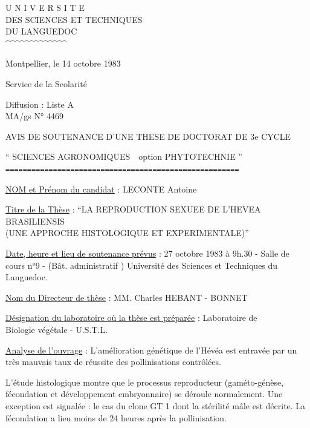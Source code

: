 
\begin{center}
U N I V E R S I T E\\
DES SCIENCES ET TECHNIQUES\\
DU LANGUEDOC\\
\textasciicircum\textasciicircum\textasciicircum\textasciicircum\textasciicircum\textasciicircum\textasciicircum\textasciicircum\textasciicircum\textasciicircum\textasciicircum\textasciicircum\textasciicircum
\end{center}

Montpellier, le 14 octobre 1983

Service de la Scolarité

Diffusion : Liste A\\
MA/gs \hfill N° 4469

\begin{center}
AVIS DE SOUTENANCE D'UNE THESE DE DOCTORAT DE 3e CYCLE

`` SCIENCES AGRONOMIQUES\ \ option PHYTOTECHNIE ''\\
\texttt{======================================================}
\end{center}

\uline{NOM et Prénom du candidat} : LECONTE Antoine

\uline{Titre de la Thèse} : ``LA REPRODUCTION SEXUEE DE L'HEVEA BRASILIENSIS\\
(UNE APPROCHE HISTOLOGIQUE ET EXPERIMENTALE)''

\uline{Date, heure et lieu de soutenance prévus} : 27 octobre 1983 à 9h.30 - Salle de cours n°9 - (Bât. administratif ) Université des Sciences et Techniques du Languedoc.

\uline{Nom du Directeur de thèse} : MM. Charles HEBANT - BONNET

\uline{Désignation du laboratoire où la thèse est préparée} : Laboratoire de\\
Biologie végétale - U.S.T.L.\hfill\handwritten{\unsure{\textbackslash}}

\uline{Analyse de l'ouvrage} : L'amélioration génétique de l'Hévéa est entravée par un très mauvais taux de réussite des pollinisations contrôlées.

L'étude histologique montre que le processus reproducteur (gaméto-génèse, fécondation et développement embryonnaire) se déroule normalement. Une exception est signalée : le cas du clone GT 1 dont la stérilité mâle est décrite. La fécondation a lieu moins de 24 heures après la pollinisation.

